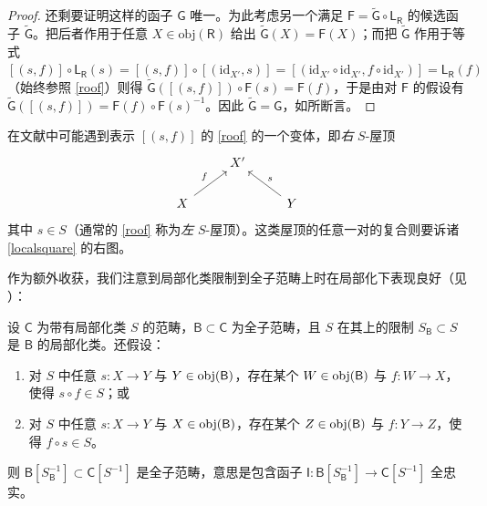 \begin{proof}
	还剩要证明这样的函子 $\mathsf{G}$ 唯一。为此考虑另一个满足 $\mathsf{F}=\tilde{\mathsf{G}}\circ\mathsf{L_R}$ 的候选函子 $\tilde{\mathsf{G}}$。把后者作用于任意 $X\in\text{obj}(\mathsf{R})$ 给出 $\tilde{\mathsf{G}}(X)=\mathsf{F}(X)$；而把 $\tilde{\mathsf{G}}$ 作用于等式 $[(s,f)]\circ\mathsf{L_R}(s)=[(s,f)]\circ[(\text{id}_{X'},s)]=[(\text{id}_{X'}\circ\text{id}_{X'},f\circ\text{id}_{X'})]=\mathsf{L_R}(f)$（始终参照 \eqref{roof}）则得 $\tilde{\mathsf{G}}([(s,f)])\circ\mathsf{F}(s)=\mathsf{F}(f)$，于是由对 $\mathsf{F}$ 的假设有 $\tilde{\mathsf{G}}([(s,f)])=\mathsf{F}(f)\circ\mathsf{F}(s)^{-1}$。因此 $\tilde{\mathsf{G}}=\mathsf{G}$，如所断言。
\end{proof}


在文献中可能遇到表示 $[(s,f)]$ 的 \eqref{roof} 的一个变体，即\textit{右} $S$-屋顶
\[
\begin{tikzcd}
	& X' & \\
	X\arrow[ur, "f"] & & Y\arrow[ul, "s"']
\end{tikzcd}
\]
其中 $s\in S$（通常的 \eqref{roof} 称为\textit{左} $S$-屋顶）。这类屋顶的任意一对的复合则要诉诸 \eqref{localsquare} 的右图。 

作为额外收获，我们注意到局部化类限制到全子范畴上时在局部化下表现良好（见 \cite[Proposition III.2.10]{[GM03]}）：

\begin{Lem}\label{derivedsubcat}
	设 $\mathsf{C}$ 为带有局部化类 $S$ 的范畴，$\mathsf{B}\subset\mathsf{C}$ 为全子范畴，且 $S$ 在其上的限制 $S_\mathsf{B}\subset S$ 是 $\mathsf{B}$ 的局部化类。还假设：
	\renewcommand{\theenumi}{\roman{enumi}}
	\begin{enumerate}[leftmargin=0.6cm]
		\item 对 $S$ 中任意 $s:X\rightarrow Y$ 与 $Y\in\textup{obj}(\mathsf{B})$，存在某个 $W\in\textup{obj}(\mathsf{B})$ 与 $f:W\rightarrow X$，使得 $s\circ f\in S$；或
		
		\item 对 $S$ 中任意 $s:X\rightarrow Y$ 与 $X\in\textup{obj}(\mathsf{B})$，存在某个 $Z\in\textup{obj}(\mathsf{B})$ 与 $f:Y\rightarrow Z$，使得 $f\circ s\in S$。
	\end{enumerate} 
	则 $\mathsf{B}[S_\mathsf{B}^{-1}]\subset\mathsf{C}[S^{-1}]$ 是全子范畴，意思是包含函子 $\mathsf{I}:\mathsf{B}[S_\mathsf{B}^{-1}]\rightarrow\mathsf{C}[S^{-1}]$ 全忠实。
\end{Lem}

